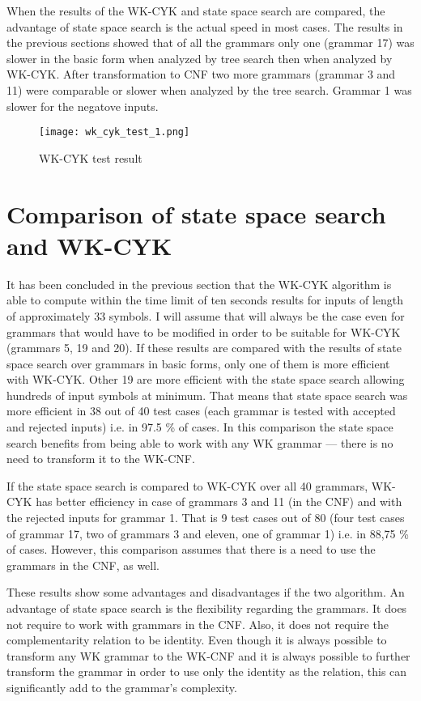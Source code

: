When the results of the WK-CYK and state space search are compared, the advantage of state space search is the actual speed in most cases. The results in the previous sections showed that of all the grammars only one (grammar 17) was slower in the basic form when analyzed by tree search then when analyzed by WK-CYK. After transformation to CNF two more grammars (grammar 3 and 11) were comparable or slower when analyzed by the tree search. Grammar 1 was slower for the negatove inputs.

\begin{figure}[h!]
  \centering
  \texttt{[image: wk\_cyk\_test\_1.png]}
  \caption{WK-CYK test result}
  \label{fig:wk_cyk_test1}
\end{figure}

\section{Comparison of state space search and WK-CYK}

It has been concluded in the previous section that the WK-CYK algorithm is able to compute within the time limit of ten seconds results for inputs of length of approximately 33 symbols. I will assume that will always be the case even for grammars that would have to be modified in order to be suitable for WK-CYK (grammars 5, 19 and 20). If these results are compared with the results of state space search over grammars in basic forms, only one of them is more efficient with WK-CYK. Other 19 are more efficient with the state space search allowing hundreds of input symbols at minimum. That means that state space search was more efficient in 38 out of 40 test cases (each grammar is tested with accepted and rejected inputs) i.e. in 97.5 \% of cases. In this comparison the state space search benefits from being able to work with any WK grammar --- there is no need to transform it to the WK-CNF.

If the state space search is compared to WK-CYK over all 40 grammars, WK-CYK has better efficiency in case of grammars 3 and 11 (in the CNF) and with the rejected inputs for grammar 1. That is 9 test cases out of 80 (four test cases of grammar 17, two of grammars 3 and eleven, one of grammar 1) i.e. in 88,75 \% of cases. However, this comparison assumes that there is a need to use the grammars in the CNF, as well.

These results show some advantages and disadvantages if the two algorithm. An advantage of state space search is the flexibility regarding the grammars. It does not require to work with grammars in the CNF. Also, it does not require the complementarity relation to be identity. Even though it is always possible to transform any WK grammar to the WK-CNF and it is always possible to further transform the grammar in order to use only the identity as the relation, this can significantly add to the grammar's complexity.


